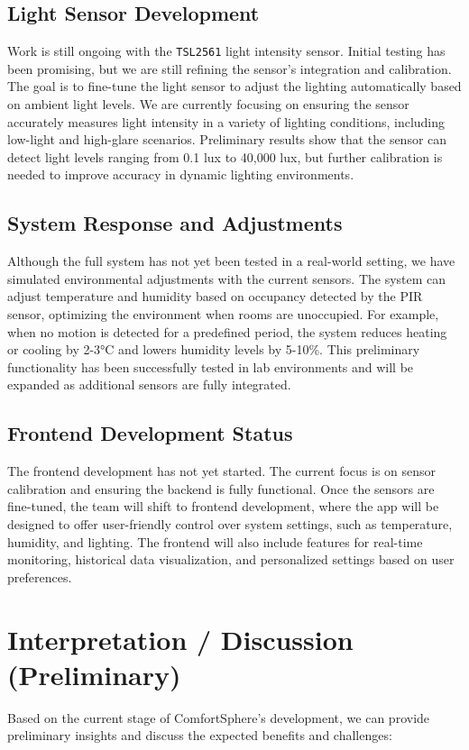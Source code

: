 \documentclass[a4paper]{scrartcl}
\begin{document}
\subsection{Light Sensor Development}  
Work is still ongoing with the \texttt{TSL2561} light intensity sensor. Initial testing has been promising, but we are still refining the sensor's integration and calibration. The goal is to fine-tune the light sensor to adjust the lighting automatically based on ambient light levels. We are currently focusing on ensuring the sensor accurately measures light intensity in a variety of lighting conditions, including low-light and high-glare scenarios. Preliminary results show that the sensor can detect light levels ranging from 0.1 lux to 40,000 lux, but further calibration is needed to improve accuracy in dynamic lighting environments.

\subsection{System Response and Adjustments}  
Although the full system has not yet been tested in a real-world setting, we have simulated environmental adjustments with the current sensors. The system can adjust temperature and humidity based on occupancy detected by the PIR sensor, optimizing the environment when rooms are unoccupied. For example, when no motion is detected for a predefined period, the system reduces heating or cooling by 2-3°C and lowers humidity levels by 5-10\%. This preliminary functionality has been successfully tested in lab environments and will be expanded as additional sensors are fully integrated.

\subsection{Frontend Development Status}  
The frontend development has not yet started. The current focus is on sensor calibration and ensuring the backend is fully functional. Once the sensors are fine-tuned, the team will shift to frontend development, where the app will be designed to offer user-friendly control over system settings, such as temperature, humidity, and lighting. The frontend will also include features for real-time monitoring, historical data visualization, and personalized settings based on user preferences.

\section{Interpretation / Discussion (Preliminary)}
Based on the current stage of ComfortSphere’s development, we can provide preliminary insights and discuss the expected benefits and challenges:
\end{document}
